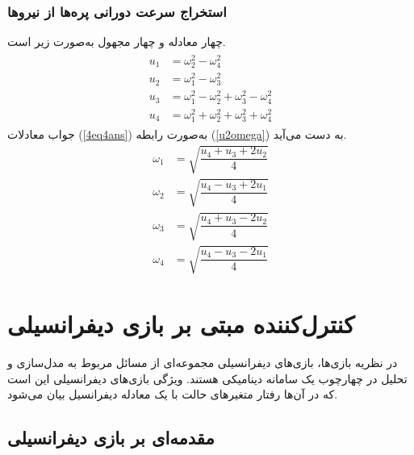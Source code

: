 \documentclass{CCI2020}
\begin{document}
\subsubsection{استخراج سرعت دورانی پره‌ها از نیروها}
چهار معادله و چهار مجهول به‌صورت زیر است.
\begin{align}\label{4eq4ans}
	\begin{split}
		u_1 &= \omega_2^2 - \omega_4^2\\
		u_2 &= \omega_1^2 - \omega_3^2\\
		u_3 &= \omega_1^2 - \omega_2^2  + \omega_3^2 - \omega_4^2\\
		u_4 &= \omega_1^2 + \omega_2^2  + \omega_3^2 + \omega_4^2
	\end{split}
\end{align}
جواب معادلات 
(\ref{4eq4ans})
به‌صورت رابطه 
(\ref{u2omega})
به دست می‌آید.
\begin{equation}\label{u2omega}
	\begin{split}
		\omega_1 &= \sqrt{\dfrac{u_4 + u_3 +2u_2}{4}}\\[1em]
		\omega_2 &= \sqrt{\dfrac{u_4 - u_3 +2u_1}{4}}\\[1em]
		\omega_3 &= \sqrt{\dfrac{u_4 + u_3 -2u_2}{4}}\\[1em]
		\omega_4 &= \sqrt{\dfrac{u_4 - u_3 -2u_1}{4}}
	\end{split}
\end{equation}





\section{کنترل‌کننده مبتی بر بازی دیفرانسیلی}
در نظریه بازی‌ها، بازی‌های دیفرانسیلی مجموعه‌ای از مسائل مربوط به مدل‌سازی و تحلیل در چهارچوب یک سامانه دینامیکی هستند. ویژگی بازی‌های دیفرانسیلی این است که در آن‌ها رفتار متغیرهای حالت با یک معادله دیفرانسیل بیان می‌شود.
\subsection{مقدمه‌ای بر بازی دیفرانسیلی}
\end{document}
